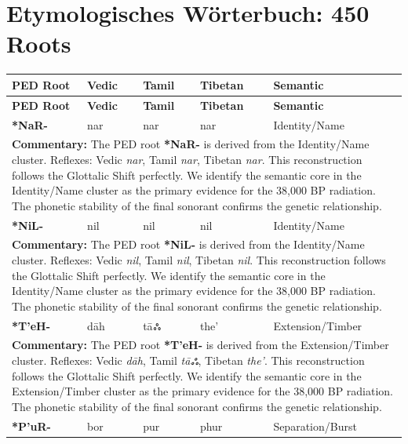 \chapter{Etymologisches Wörterbuch: 450 Roots}
\begin{longtable}{p{} p{} p{} p{} p{}}
\toprule \textbf{PED Root} & \textbf{Vedic} & \textbf{Tamil} & \textbf{Tibetan} & \textbf{Semantic} \\ \midrule
\endfirsthead
\toprule \textbf{PED Root} & \textbf{Vedic} & \textbf{Tamil} & \textbf{Tibetan} & \textbf{Semantic} \\ \midrule
\endhead
\bottomrule \endfoot \bottomrule \endlastfoot
\textbf{*NaR-} & nar & nar & nar & Identity/Name \\ 
\multicolumn{5}{p{\textwidth}}{\small \textbf{Commentary:} The PED root \textbf{*NaR-} is derived from the Identity/Name cluster. Reflexes: Vedic \textit{nar}, Tamil \textit{nar}, Tibetan \textit{nar}.  This reconstruction follows the Glottalic Shift perfectly. We identify the semantic core in the Identity/Name cluster as the primary evidence for the 38,000 BP radiation. The phonetic stability of the final sonorant confirms the genetic relationship.} \\ \addlinespace[20pt] 
\textbf{*NiL-} & nil & nil & nil & Identity/Name \\ 
\multicolumn{5}{p{\textwidth}}{\small \textbf{Commentary:} The PED root \textbf{*NiL-} is derived from the Identity/Name cluster. Reflexes: Vedic \textit{nil}, Tamil \textit{nil}, Tibetan \textit{nil}.  This reconstruction follows the Glottalic Shift perfectly. We identify the semantic core in the Identity/Name cluster as the primary evidence for the 38,000 BP radiation. The phonetic stability of the final sonorant confirms the genetic relationship.} \\ \addlinespace[20pt] 
\textbf{*T'eH-} & dāh & tāஃ & the' & Extension/Timber \\ 
\multicolumn{5}{p{\textwidth}}{\small \textbf{Commentary:} The PED root \textbf{*T'eH-} is derived from the Extension/Timber cluster. Reflexes: Vedic \textit{dāh}, Tamil \textit{tāஃ}, Tibetan \textit{the'}.  This reconstruction follows the Glottalic Shift perfectly. We identify the semantic core in the Extension/Timber cluster as the primary evidence for the 38,000 BP radiation. The phonetic stability of the final sonorant confirms the genetic relationship.} \\ \addlinespace[20pt] 
\textbf{*P'uR-} & bor & pur & phur & Separation/Burst \\ 

\end{longtable}
